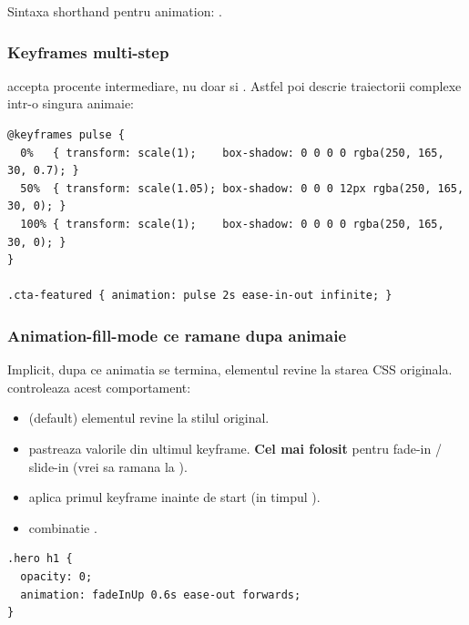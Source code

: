 Sintaxa shorthand pentru animation: .

\subsubsection{Keyframes multi-step}

 accepta procente intermediare, nu doar  si . Astfel poi descrie traiectorii complexe intr-o singura animaie:

\begin{lstlisting}[style=css, caption={Buton care ,,pulseaz\u a'' atragator}]
@keyframes pulse {
  0%   { transform: scale(1);    box-shadow: 0 0 0 0 rgba(250, 165, 30, 0.7); }
  50%  { transform: scale(1.05); box-shadow: 0 0 0 12px rgba(250, 165, 30, 0); }
  100% { transform: scale(1);    box-shadow: 0 0 0 0 rgba(250, 165, 30, 0); }
}

.cta-featured { animation: pulse 2s ease-in-out infinite; }
\end{lstlisting}

\subsubsection{Animation-fill-mode \textendash{} ce ramane dupa animaie}

Implicit, dupa ce animatia se termina, elementul revine la starea CSS originala.  controleaza acest comportament:

\begin{itemize}[itemsep=1pt]
  \item {} (default) \textendash{} elementul revine la stilul original.
  \item {} \textendash{} pastreaza valorile din ultimul keyframe. \textbf{Cel mai folosit} pentru fade-in / slide-in (vrei sa ramana la ).
  \item {} \textendash{} aplica primul keyframe inainte de start (in timpul ).
  \item {} \textendash{} combinatie .
\end{itemize}

\begin{lstlisting}[style=css, caption={Fade-in care r\u amane vizibil}]
.hero h1 {
  opacity: 0;
  animation: fadeInUp 0.6s ease-out forwards;
}
\end{lstlisting}

